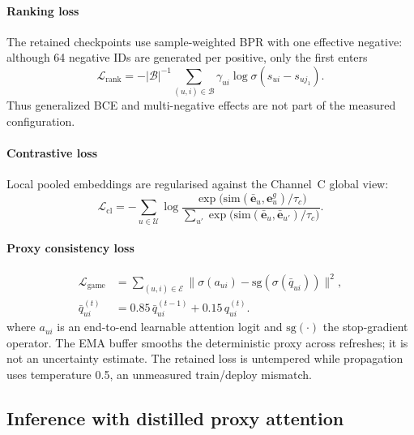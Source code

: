 \documentclass[a4paper,fleqn,longmktitle]{cas-dc}
\begin{document}
\paragraph{Ranking loss}
The retained checkpoints use sample-weighted BPR with one effective negative:
although 64 negative IDs are generated per positive, only the first enters
\begin{equation}
\mathcal L_{\mathrm{rank}}=-|\mathcal B|^{-1}
\sum_{(u,i)\in\mathcal B}\gamma_{ui}
\log\sigma(s_{ui}-s_{uj_1}).
\label{eq:rank}
\end{equation}
Thus generalized BCE and multi-negative effects are not part of the measured
configuration.

\paragraph{Contrastive loss}
Local pooled embeddings are regularised against the Channel~C global view:
\begin{equation}
\mathcal{L}_{\mathrm{cl}} = -\sum_{u \in \mathcal{U}}
\log \frac{\exp\bigl(\mathrm{sim}(\bar{\mathbf{e}}_u,
\mathbf{e}^{g}_u)/\tau_c\bigr)}
{\sum_{u'} \exp\bigl(\mathrm{sim}(\bar{\mathbf{e}}_u,
\bar{\mathbf{e}}_{u'})/\tau_c\bigr)} .
\label{eq:cl}
\end{equation}

\paragraph{Proxy consistency loss}
\begin{align}
\mathcal{L}_{\mathrm{game}} &= \sum_{(u,i) \in \mathcal{E}}
\bigl\lVert \sigma(a_{ui}) -
\mathrm{sg}\!\left(\sigma(\bar q_{ui})\right)
\bigr\rVert^2, \label{eq:game}\\
\bar q^{(t)}_{ui} &= 0.85\,\bar q^{(t-1)}_{ui}+0.15\,q^{(t)}_{ui}.
\label{eq:proxyema}
\end{align}
where $a_{ui}$ is an end-to-end learnable attention logit and
$\mathrm{sg}(\cdot)$ the stop-gradient operator. The EMA buffer smooths the deterministic proxy across refreshes; it is not an uncertainty estimate. The retained loss is untempered while propagation uses temperature 0.5, an unmeasured train/deploy mismatch.

\subsection{Inference with distilled proxy attention}
\label{sec:zero}
\end{document}
